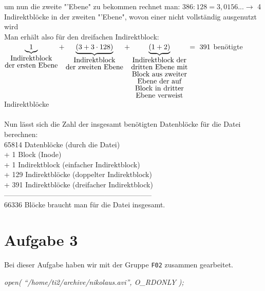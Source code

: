\documentclass{ti2}
\begin{document}
um nun die zweite "'Ebene" zu bekommen rechnet man: $386 : 128 = 3,0156... \rightarrow$ 4 Indirektblöcke in der zweiten "'Ebene", wovon einer nicht vollständig ausgenutzt wird \\
Man erhält also für den dreifachen Indirektblock: \\
$\underbrace{1}_{\shortstack{Indirektblock\\ der ersten Ebene}} + \underbrace{(3 + 3 \cdot 128)}_{\shortstack{Indirektblock\\ der zweiten Ebene}} + \underbrace{(1 + 2)}_{\shortstack{Indirektblock der\\ dritten Ebene mit\\ Block aus zweiter\\ Ebene der auf\\ Block in dritter\\ Ebene verweist}}  = ~391$ benötigte Indirektblöcke \\\\
Nun lässt sich die Zahl der insgesamt benötigten Datenblöcke für die Datei berechnen: \\
65814 Datenblöcke (durch die Datei) \\
+ 1 Block (Inode) \\
+ 1 Indirektblock (einfacher Indirektblock) \\
+ 129 Indirektblöcke (doppelter Indirektblock) \\
+ 391 Indirektblöcke (dreifacher Indirektblock) \\
-------------------------------------------------------------- \\
66336 Blöcke braucht man für die Datei insgesamt.



\section*{Aufgabe 3}
Bei dieser Aufgabe haben wir mit der Gruppe \texttt{F02} zusammen gearbeitet.

\emph{open( ``/home/ti2/archive/nikolaus.avi'', O\_RDONLY );}
\end{document}
